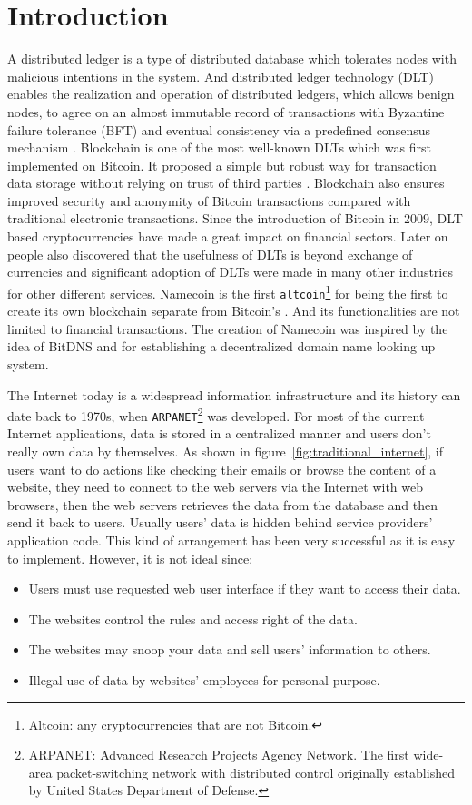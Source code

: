 \section{Introduction}
\label{sec:introduction}

A distributed ledger is a type of distributed database which tolerates nodes with malicious intentions in the system.
And distributed ledger technology (DLT) enables the realization and operation of distributed ledgers,
which allows benign nodes, to agree on an almost immutable record of transactions with Byzantine failure tolerance (BFT) and eventual consistency via a predefined consensus mechanism \cite{Sunyaev2020}.
Blockchain is one of the most well-known DLTs which was first implemented on Bitcoin. It proposed a simple but robust way for transaction data storage without relying on trust of third parties \cite{nakamoto2008peer}.
Blockchain also ensures improved security and anonymity of Bitcoin transactions compared with traditional electronic transactions.
Since the introduction of Bitcoin in 2009, DLT based cryptocurrencies have made a great impact on financial sectors. Later on people also discovered that the usefulness of DLTs is beyond exchange of currencies and
significant adoption of DLTs were made in many other industries for other different services.
Namecoin is the first \texttt{altcoin}\footnote{Altcoin: any cryptocurrencies that are not Bitcoin.} for being the first to create its own blockchain separate from Bitcoin's \cite{kalodner2015empirical}.
And its functionalities are not limited to financial transactions.
The creation of Namecoin was inspired by the idea of BitDNS \cite{merited2010bitdns} and for establishing a decentralized domain name looking up system.


The Internet today is a widespread information infrastructure and its history can date back to 1970s, when \texttt{ARPANET}\footnote{ARPANET: Advanced Research Projects Agency Network.
    The first wide-area packet-switching network with distributed control originally established by United States Department of Defense.} was developed.
For most of the current Internet applications, data is stored in a centralized manner and users don't really own data by themselves. As shown in figure~\ref{fig:traditional_internet},
if users want to do actions like checking their emails or browse the content of a website, they need to connect to the web servers via the Internet with web browsers, then the web servers retrieves the data from the database and then send it back to users.
Usually users' data is hidden behind service providers' application code. This kind of arrangement has been very successful as it is easy to implement. However, it is not ideal since:
\begin{itemize}
    \item Users must use requested web user interface if they want to access their data.
    \item The websites control the rules and access right of the data.
    \item The websites may snoop your data and sell users' information to others.
    \item Illegal use of data by websites' employees for personal purpose.
\end{itemize}

